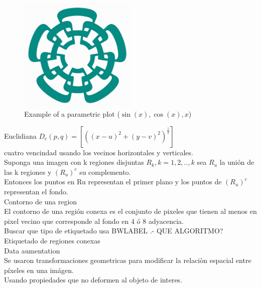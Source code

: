 \documentclass[a4paper, 11pt]{article}
\begin{document}
\begin{figure}[h]
\centering
\includegraphics[width=0.5\textwidth]{cinves}
\caption{Example of a parametric plot ($\sin (x), \cos(x), x$)}
\end{figure}

Euclidiana $D_{e}(p,q)=[((x-u)^{2}+(y-v)^{2})^{\frac{1}{2}}]$ \\

cuatro vencindad usando los vecinos horizontales y verticales.\\

Suponga una imagen con k regiones disjuntas $R_{k}, k=1,2,..,k$ sea $R_{u}$ la unión de las k regiones y $(R_{u})^{c}$ su complemento.\\

Entonces los puntos en Ru representan el primer plano y los puntos de $(R_{u})^{c}$ representan el fondo.\\

Contorno de una region\\

El contorno de una región conexa es el conjunto de pixeles que tienen al menos en pixel vecino que corresponde al fondo en 4 ó 8 adyacencia.\\

Buscar que tipo de etiquetado usa BWLABEL .- QUE ALGORITMO?\\

Etiquetado de regiones conexas\\

Data aumentation\\

Se usaron transformaciones geometricas para modificar la relaciòn espacial entre píxeles en una imágen.\\

Usando propiedades que no deformen al objeto de interes.\\
\end{document}
